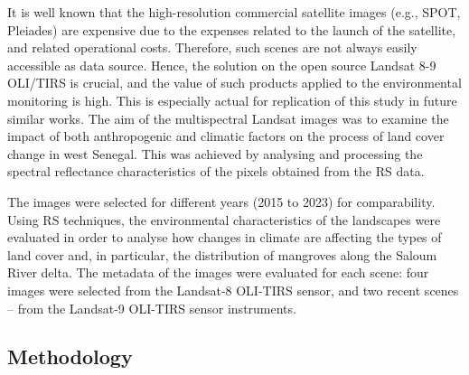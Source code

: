 \documentclass[earth,article,submit,pdftex,moreauthors]{Definitions/mdpi}
\begin{document}
It is well known that the high-resolution commercial satellite images (e.g., SPOT, Pleiades) are{ }expensive due to the {expenses related to} the launch of the satellite, and related operational costs. Therefore, such scenes are not always easily accessible as data source. Hence, the solution{ }on the open source Landsat 8-9 OLI/TIRS {is} crucial, and the value of{ such} products {applied to the }environmental monitoring {is} high{. This is }especially {actual for{ }replication of this study} in future similar works{.} The {aim} of the multispectral Landsat images was to {examine the impact of both} anthropogenic and climatic factors {on the process of land cover change} in west Senegal. {This was achieved by analysing and processing} the spectral reflectance characteristics of the pixels {obtained} from the {RS} data{.} 

{The} images were selected for different years (2015 to 2023){ }for comparability{. }{Using RS techniques,} the environmental {characteristics} of the landscapes were {evaluated} in order to analyse how changes in climate are affecting the types of land cover and{, in particular, the} distribution of mangroves along the {Saloum River delta.} The {metadata of the}{ }images were evaluated for each scene: four images were selected from the Landsat-8 {OLI-TIRS sensor}, and two recent scenes -- from the Landsat-9 {OLI-TIRS sensor instruments}. 

\subsection{Methodology}
\end{document}
